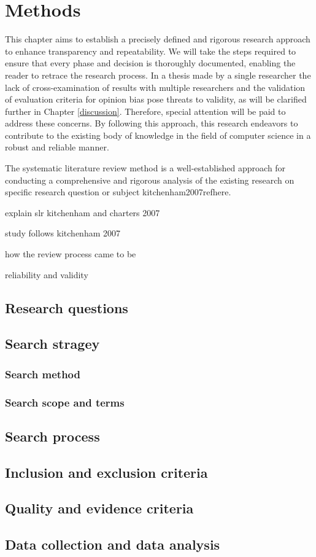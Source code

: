\chapter{Methods\label{methods}}
This chapter aims to establish a precisely defined and rigorous research approach to enhance transparency and repeatability. We will take the steps required to ensure that every phase and decision is thoroughly documented, enabling the reader to retrace the research process. In a thesis made by a single researcher the lack of cross-examination of results with multiple researchers and the validation of evaluation criteria for opinion bias pose threats to validity, as will be clarified further in Chapter \ref{discussion}. Therefore, special attention will be paid to address these concerns. By following this approach, this research endeavors to contribute to the existing body of knowledge in the field of computer science in a robust and reliable manner.

The systematic literature review method is a well-established approach for conducting a comprehensive and rigorous analysis of the existing research on specific research question or subject kitchenham2007refhere.

 explain slr kitchenham and charters 2007

 study follows kitchenham 2007
 
 how the review process came to be

 reliability and validity

\section{Research questions}
\section{Search stragey}
\subsection{Search method}
\subsection{Search scope and terms}
\section{Search process}
\section{Inclusion and exclusion criteria}
\section{Quality and evidence criteria}
\section{Data collection and data analysis}
